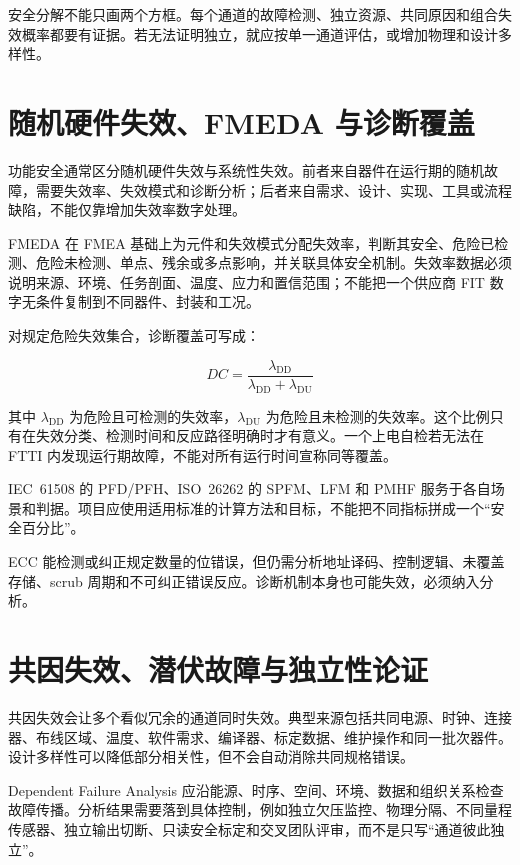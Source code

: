 安全分解不能只画两个方框。每个通道的故障检测、独立资源、共同原因和组合失效概率都要有证据。若无法证明独立，就应按单一通道评估，或增加物理和设计多样性。

\section{随机硬件失效、FMEDA 与诊断覆盖}

功能安全通常区分随机硬件失效与系统性失效。前者来自器件在运行期的随机故障，需要失效率、失效模式和诊断分析；后者来自需求、设计、实现、工具或流程缺陷，不能仅靠增加失效率数字处理。

FMEDA 在 FMEA 基础上为元件和失效模式分配失效率，判断其安全、危险已检测、危险未检测、单点、残余或多点影响，并关联具体安全机制。失效率数据必须说明来源、环境、任务剖面、温度、应力和置信范围；不能把一个供应商 FIT 数字无条件复制到不同器件、封装和工况。

对规定危险失效集合，诊断覆盖可写成：

\begin{equation}
  DC=\frac{\lambda_{\mathrm{DD}}}
  {\lambda_{\mathrm{DD}}+\lambda_{\mathrm{DU}}}
\end{equation}

其中 $\lambda_{\mathrm{DD}}$ 为危险且可检测的失效率，$\lambda_{\mathrm{DU}}$ 为危险且未检测的失效率。这个比例只有在失效分类、检测时间和反应路径明确时才有意义。一个上电自检若无法在 FTTI 内发现运行期故障，不能对所有运行时间宣称同等覆盖。

IEC~61508 的 PFD/PFH、ISO~26262 的 SPFM、LFM 和 PMHF 服务于各自场景和判据\cite{iec61508,iso26262}。项目应使用适用标准的计算方法和目标，不能把不同指标拼成一个“安全百分比”。

ECC 能检测或纠正规定数量的位错误，但仍需分析地址译码、控制逻辑、未覆盖存储、scrub 周期和不可纠正错误反应。诊断机制本身也可能失效，必须纳入分析。

\section{共因失效、潜伏故障与独立性论证}

共因失效会让多个看似冗余的通道同时失效。典型来源包括共同电源、时钟、连接器、布线区域、温度、软件需求、编译器、标定数据、维护操作和同一批次器件。设计多样性可以降低部分相关性，但不会自动消除共同规格错误。

Dependent Failure Analysis 应沿能源、时序、空间、环境、数据和组织关系检查故障传播。分析结果需要落到具体控制，例如独立欠压监控、物理分隔、不同量程传感器、独立输出切断、只读安全标定和交叉团队评审，而不是只写“通道彼此独立”。

